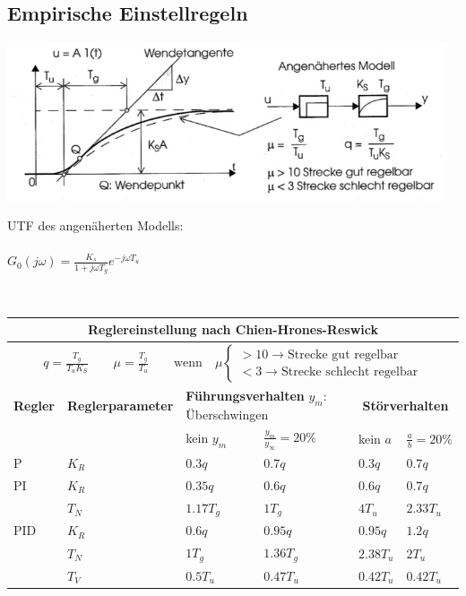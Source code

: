 	\subsection{Empirische Einstellregeln }
		\includegraphics[width=13cm]{./bilder/Empirisch_Regeln.jpg}
		\begin{minipage}[b]{5cm}
        UTF des angenäherten Modells:\\ \\
		$G_0(j\omega)=\frac{K_s}{1+j\omega T_g}e^{-j\omega T_u}$
		\vspace{2.7cm}
		\end{minipage}\\
		
	\begin{tabular}{|l|p{1.8cm}|l|l|l|l|}
	    \hline
	    \multicolumn{6}{|c|}{
	      \textbf{Reglereinstellung nach Chien-Hrones-Reswick}
	    }
		\\ \hline
		\multicolumn{6}{|c|}{
		  $
		  q = \frac{T_g}{T_uK_S} \qquad \mu = \frac{T_g}{T_u}
		  \qquad \text{wenn} \quad \mu
		  \begin{cases}
		    > 10 \rightarrow \text{Strecke gut regelbar} \\
		    < 3 \rightarrow \text{Strecke schlecht regelbar}
		  \end{cases}
		  $
		}
		\\ \hline
		\textbf{Regler} & \textbf{Regler\-parameter} &
		\multicolumn{2}{|p{3.5cm}|}{\textbf{Führungsverhalten} \newline $y_m$:
		Überschwingen} &
		\multicolumn{2}{|c|}{\textbf{Störverhalten}}
		\\ \hline
		& & kein $y_m$ & $\frac{y_m}{y_\infty} = 20 \%$ & kein $a$ & $\frac{a}{b}= 20
		\%$
		\\ \hline
		P 	& $K_R$ 	& $0.3q$ 	& $0.7q$ 	& $0.3q$ 	& $0.7q$
		\\ \hline
		PI	& $K_R$		& $0.35q$	& $0.6q$	& $0.6q$	& $0.7q$
		\\
		    & $T_N$		& $1.17T_g$	& $1T_g$	& $4T_u$	& $2.33T_u$
		\\ \hline
		PID & $K_R$		& $0.6q$	& $0.95q$	& $0.95q$	& $1.2q$
		\\
			& $T_N$		& $1T_g$	& $1.36T_g$	& $2.38T_u$	& $2T_u$
		\\
			& $T_V$		& $0.5T_u$	& $0.47T_u$	& $0.42T_u$	& $0.42T_u$
		\\ \hline
	\end{tabular}
		

